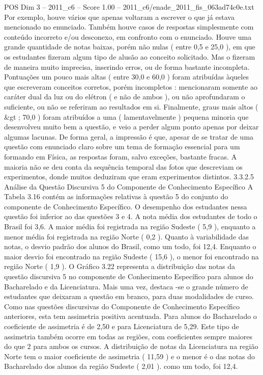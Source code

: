\begin{textsample}{POS Dim 3 – 2011\_c6 – Score 1.00 – 2011\_c6/enade\_2011\_fis\_063ad74c0e.txt}
Por exemplo, houve vários que apenas voltaram a escrever o que já estava mencionado no enunciado.
Também houve casos de respostas simplesmente com conteúdo incorreto e/ou desconexo, em confronto com o enunciado.
Houve uma grande quantidade de notas baixas, porém não nulas ( entre 0,5 e 25,0 ), em que os estudantes fizeram algum tipo de alusão ao conceito solicitado.
Mas o fizeram de maneira muito imprecisa, inserindo erros, ou de forma bastante incompleta.
Pontuações um pouco mais altas ( entre 30,0 e 60,0 ) foram atribuídas àqueles que escreveram conceitos corretos, porém incompletos : mencionaram somente ao caráter dual da luz ou do elétron ( e não de ambos ), ou não aprofundaram o suficiente, ou não se referiram ao resultados em si.
Finalmente, graus mais altos ( \&gt ; 70,0 ) foram atribuídos a uma ( lamentavelmente ) pequena minoria que desenvolveu muito bem a questão, e veio a perder algum ponto apenas por deixar algumas lacunas.
De forma geral, a impressão é que, apesar de se tratar de uma questão com enunciado claro sobre um tema de formação essencial para um formando em Física, as respostas foram, salvo exceções, bastante fracas.
A maioria não se deu conta da sequência temporal das fotos que descreviam os experimentos, donde muitos deduziram que eram experimentos distintos. 3.3.2.5 Análise da Questão Discursiva 5 do Componente de Conhecimento Específico A Tabela 3.16 contém as informações relativas à questão 5 do conjunto do componente de Conhecimento Específico.
O desempenho dos estudantes nessa questão foi inferior ao das questões 3 e 4.
A nota média dos estudantes de todo o Brasil foi 3,6.
A maior média foi registrada na região Sudeste ( 5,9 ), enquanto a menor média foi registrada na região Norte ( 0,2 ).
Quanto à variabilidade das notas, o desvio padrão dos alunos do Brasil, como um todo, foi 12,4.
Enquanto o maior desvio foi encontrado na região Sudeste ( 15,6 ), o menor foi encontrado na região Norte ( 1,9 ).
O Gráfico 3.22 representa a distribuição das notas da questão discursiva 5 no componente de Conhecimento Específico para alunos do Bacharelado e da Licenciatura.
Mais uma vez, destaca -se o grande número de estudantes que deixaram a questão em branco, para duas modalidades de curso.
Como nas questões discursivas do Componente de Conhecimento Específico anteriores, esta tem assimetria positiva acentuada.
Para alunos do Bacharelado o coeficiente de assimetria é de 2,50 e para Licenciatura de 5,29.
Este tipo de assimetria também ocorre em todas as regiões, com coeficientes sempre maiores do que 2 para ambos os cursos.
A distribuição de notas da Licenciatura na região Norte tem o maior coeficiente de assimetria ( 11,59 ) e o menor é o das notas do Bacharelado dos alunos da região Sudeste ( 2,01 ). como um todo, foi 12,4.

\end{textsample}
